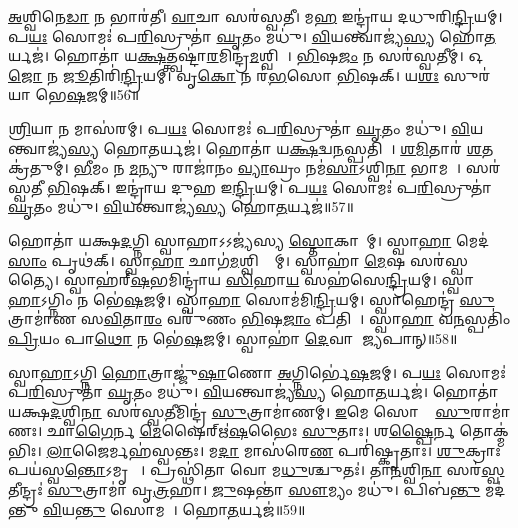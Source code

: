 \ul{𑌅}𑌶𑍍𑌵𑌿𑌨𑍇\ul{𑌡𑌾} 𑌨 𑌭𑌾𑌰॑𑌤𑍀।
\ul{𑌵𑌾}𑌚𑌾 𑌸𑌰॑𑌸𑍍𑌵𑌤𑍀।
𑌮\ul{𑌹} 𑌇𑌨𑍍𑌦𑍍𑌰𑌾॑𑌯 𑌦𑌧𑍁𑌰𑌿\ul{𑌨𑍍𑌦𑍍𑌰𑌿}𑌯𑌮𑍍।
𑌪\ul{𑌯𑌃} 𑌸𑍋𑌮𑌃॑ 𑌪\ul{𑌰𑌿}𑌸𑍍𑌰𑍁𑌤𑌾॑ \ul{𑌘𑍃}𑌤𑌂 𑌮𑌧𑍁॑।
\ul{𑌵𑌿}𑌯𑌨𑍍𑌤𑍍𑌵𑌾𑌜𑍍𑌯॑\ul{𑌸𑍍𑌯} 𑌹𑍋\ul{𑌤}𑌰𑍍𑌯𑌜॑।
𑌹𑍋𑌤𑌾॑ 𑌯\ul{𑌕𑍍𑌷}𑌤𑍍𑌤𑍍𑌵𑌷𑍍𑌟𑌾॑\ul{𑌰}𑌮𑌿𑌨𑍍𑌦𑍍𑌰॑\ul{𑌮}𑌶𑍍𑌵𑌿𑌨𑌾᳚।
\ul{𑌭𑌿}𑌷\ul{𑌜𑌂} 𑌨 𑌸𑌰॑𑌸𑍍𑌵𑌤𑍀𑌮𑍍।
𑌓\ul{𑌜𑍋} 𑌨 \ul{𑌜𑍂}𑌤𑌿𑌰𑌿॑\ul{𑌨𑍍𑌦𑍍𑌰𑌿}𑌯𑌮𑍍।
𑌵𑍃\ul{𑌕𑍋} 𑌨 𑌰॑\ul{𑌭}𑌸𑍋 \ul{𑌭𑌿}𑌷𑌕𑍍।
𑌯\ul{𑌶𑌃} 𑌸𑍁𑌰॑𑌯𑌾 𑌭𑍇\ul{𑌷}𑌜𑌮𑍍॥56॥

\ul{𑌶𑍍𑌰𑌿}𑌯𑌾 𑌨 𑌮𑌾𑌸॑𑌰𑌮𑍍।
𑌪\ul{𑌯𑌃} 𑌸𑍋𑌮𑌃॑ 𑌪\ul{𑌰𑌿}𑌸𑍍𑌰𑍁𑌤𑌾॑ \ul{𑌘𑍃}𑌤𑌂 𑌮𑌧𑍁॑।
\ul{𑌵𑌿}𑌯𑌨𑍍𑌤𑍍𑌵𑌾𑌜𑍍𑌯॑\ul{𑌸𑍍𑌯} 𑌹𑍋\ul{𑌤}𑌰𑍍𑌯𑌜॑।
𑌹𑍋𑌤𑌾॑ 𑌯\ul{𑌕𑍍𑌷}𑌦𑍍𑌵\ul{𑌨}𑌸𑍍𑌪𑌤𑌿𑌮𑍍᳚।
\ul{𑌶}\ul{𑌮𑌿}𑌤𑌾𑌰॑ \ul{𑌶}𑌤𑌕𑍍𑌰॑𑌤𑍁𑌮𑍍।
\ul{𑌭𑍀}𑌮𑌂 𑌨 \ul{𑌮}𑌨𑍍𑌯𑍁 𑌰𑌾𑌜𑌾॑𑌨𑌂 \ul{𑌵𑍍𑌯𑌾}𑌘𑍍𑌰𑌂 𑌨𑌮॑\ul{𑌸𑌾}\-𑌽𑌶𑍍𑌵𑌿\ul{𑌨𑌾} 𑌭𑌾𑌮𑌮𑍍᳚।
𑌸𑌰॑𑌸𑍍𑌵𑌤𑍀 \ul{𑌭𑌿}𑌷𑌕𑍍।
𑌇𑌨𑍍𑌦𑍍𑌰𑌾॑𑌯 𑌦𑍁𑌹 𑌇\ul{𑌨𑍍𑌦𑍍𑌰𑌿}𑌯𑌮𑍍।
𑌪\ul{𑌯𑌃} 𑌸𑍋𑌮𑌃॑ 𑌪\ul{𑌰𑌿}𑌸𑍍𑌰𑍁𑌤𑌾॑ \ul{𑌘𑍃}𑌤𑌂 𑌮𑌧𑍁॑।
\ul{𑌵𑌿}𑌯𑌨𑍍𑌤𑍍𑌵𑌾𑌜𑍍𑌯॑\ul{𑌸𑍍𑌯} 𑌹𑍋\ul{𑌤}𑌰𑍍𑌯𑌜॑॥57॥

𑌹𑍋𑌤𑌾॑ 𑌯𑌕𑍍𑌷\ul{𑌦}𑌗𑍍𑌨𑌿 𑌸𑍍𑌵𑌾𑌹𑌾\-𑌽𑌽𑌜𑍍𑌯॑𑌸𑍍𑌯 \ul{𑌸𑍍𑌤𑍋}𑌕𑌾𑌨𑌾᳚𑌮𑍍।
𑌸𑍍𑌵𑌾\ul{𑌹𑌾} 𑌮𑍇𑌦॑\ul{𑌸𑌾𑌂} 𑌪𑍃𑌥॑𑌕𑍍।
𑌸𑍍𑌵𑌾\ul{𑌹𑌾} 𑌛𑌾𑌗॑\ul{𑌮}𑌶𑍍𑌵𑌿𑌭𑍍𑌯𑌾᳚𑌮𑍍।
𑌸𑍍𑌵𑌾𑌹𑌾॑ \ul{𑌮𑍇}𑌷 𑌸𑌰॑𑌸𑍍𑌵𑌤𑍍𑌯𑍈।
𑌸𑍍𑌵𑌾𑌹॑𑌰𑍍‌\mbox{}\ul{𑌷}𑌭𑌮𑌿𑌨𑍍𑌦𑍍𑌰𑌾॑𑌯 \ul{𑌸𑌿}\ul{}𑌹𑌾\ul{𑌯} 𑌸𑌹॑𑌸𑍇\ul{𑌨𑍍𑌦𑍍𑌰𑌿}𑌯𑌮𑍍।
𑌸𑍍𑌵𑌾\ul{𑌹𑌾}\-𑌽𑌗𑍍𑌨𑌿𑌂 𑌨 𑌭𑍇॑\ul{𑌷}𑌜𑌮𑍍।
𑌸𑍍𑌵𑌾\ul{𑌹𑌾} 𑌸𑍋𑌮॑𑌮𑌿\ul{𑌨𑍍𑌦𑍍𑌰𑌿}𑌯𑌮𑍍।
𑌸𑍍𑌵𑌾𑌹𑍇𑌨𑍍𑌦𑍍𑌰॑ \ul{𑌸𑍁}𑌤𑍍𑌰𑌾𑌮𑌾॑𑌣 𑌸\ul{𑌵𑌿}𑌤𑌾\ul{𑌰𑌂} 𑌵𑌰𑍁॑𑌣𑌂 \ul{𑌭𑌿}𑌷\ul{𑌜𑌾𑌂} 𑌪𑌤𑌿𑌮𑍍᳚।
𑌸𑍍𑌵𑌾\ul{𑌹𑌾} 𑌵\ul{𑌨}𑌸𑍍𑌪𑌤𑌿𑌂॑ \ul{𑌪𑍍𑌰𑌿}𑌯𑌂 𑌪𑌾\ul{𑌥𑍋} 𑌨 𑌭𑍇॑\ul{𑌷}𑌜𑌮𑍍।
𑌸𑍍𑌵𑌾𑌹𑌾॑ \ul{𑌦𑍇}𑌵𑌾 𑌆᳚\ul{𑌜𑍍𑌯}𑌪𑌾𑌨𑍍॥58॥

𑌸𑍍𑌵𑌾\ul{𑌹𑌾}\-𑌽𑌗𑍍𑌨𑌿 \ul{𑌹𑍋}𑌤𑍍𑌰𑌾𑌜𑍍𑌜𑍁॑\ul{𑌷𑌾}𑌣𑍋 \ul{𑌅}𑌗𑍍𑌨𑌿𑌰𑍍𑌭𑍇॑\ul{𑌷}𑌜𑌮𑍍।
𑌪\ul{𑌯𑌃} 𑌸𑍋𑌮𑌃॑ 𑌪\ul{𑌰𑌿}𑌸𑍍𑌰𑍁𑌤𑌾॑ \ul{𑌘𑍃}𑌤𑌂 𑌮𑌧𑍁॑।
\ul{𑌵𑌿}𑌯𑌨𑍍𑌤𑍍𑌵𑌾𑌜𑍍𑌯॑\ul{𑌸𑍍𑌯} 𑌹𑍋\ul{𑌤}𑌰𑍍𑌯𑌜॑।
𑌹𑍋𑌤𑌾॑ 𑌯𑌕𑍍𑌷\ul{𑌦}𑌶𑍍𑌵𑌿\ul{𑌨𑌾} 𑌸𑌰॑𑌸𑍍𑌵\ul{𑌤𑍀}𑌮𑌿𑌨𑍍𑌦𑍍𑌰॑ \ul{𑌸𑍁}𑌤𑍍𑌰𑌾𑌮𑌾॑𑌣𑌮𑍍।
\ul{𑌇}𑌮𑍇 𑌸𑍋𑌮𑌾𑌃᳚ \ul{𑌸𑍁}𑌰𑌾𑌮𑌾॑𑌣𑌃।
𑌛𑌾\ul{𑌗𑍈}𑌰𑍍𑌨 \ul{𑌮𑍇}𑌷𑍈𑌰𑍍\mbox{}𑌋॑\ul{𑌷}𑌭𑍈𑌃 \ul{𑌸𑍁}𑌤𑌾𑌃।
𑌶\ul{𑌷𑍍𑌪𑍈}𑌰𑍍𑌨 𑌤𑍋𑌕𑍍𑌮॑𑌭𑌿𑌃।
\ul{𑌲𑌾}𑌜𑍈𑌰𑍍𑌮𑌹॑𑌸𑍍𑌵𑌨𑍍𑌤𑌃।
𑌮\ul{𑌦𑌾} 𑌮𑌾𑌸॑𑌰𑍇\ul{𑌣} 𑌪𑌰𑌿॑𑌷𑍍𑌕𑍃𑌤𑌾𑌃।
\ul{𑌶𑍁}𑌕𑍍𑌰𑌾𑌃 𑌪𑌯॑𑌸𑍍𑌵\ul{𑌨𑍍𑌤𑍋}\-𑌽𑌮𑍃𑌤𑌾𑌃᳚।
𑌪𑍍𑌰𑌸𑍍𑌥𑌿॑𑌤𑌾 𑌵𑍋 𑌮\ul{𑌧𑍁}𑌶𑍍𑌚𑍁𑌤𑌃॑।
𑌤𑌾\ul{𑌨}𑌶𑍍𑌵𑌿\ul{𑌨𑌾} 𑌸𑌰॑\ul{𑌸𑍍𑌵}𑌤𑍀𑌨𑍍𑌦𑍍𑌰𑌃॑ \ul{𑌸𑍁}𑌤𑍍𑌰𑌾𑌮𑌾॑ 𑌵𑍃\ul{𑌤𑍍𑌰}𑌹𑌾।
\ul{𑌜𑍁}𑌷𑌨𑍍𑌤𑌾॑ \ul{𑌸𑍗}𑌮𑍍𑌯𑌂 𑌮𑌧𑍁॑।
𑌪𑌿𑌬॑\ul{𑌨𑍍𑌤𑍁} 𑌮𑌦॑𑌨𑍍𑌤𑍁 \ul{𑌵𑌿}𑌯\ul{𑌨𑍍𑌤𑍁} 𑌸𑍋𑌮𑌮𑍍᳚।
𑌹𑍋\ul{𑌤}𑌰𑍍𑌯𑌜॑॥59॥

